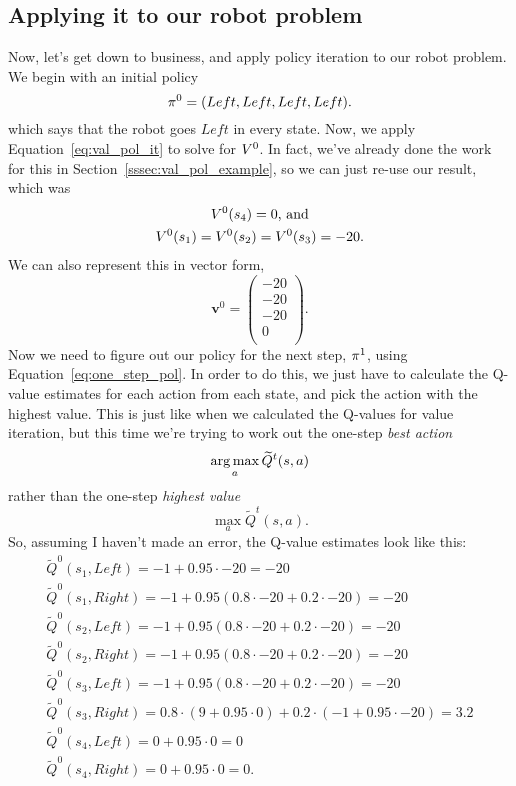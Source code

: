 \documentclass[a4paper]{article}
\begin{document}
\subsection{Applying it to our robot problem}
Now, let's get down to business, and apply policy iteration to our robot
problem.
We begin with an initial policy
\begin{equation*}
  \pi^0 = (Left, Left, Left, Left) .
\end{equation*}
which says that the robot goes $Left$ in every state.
Now, we apply Equation~\ref{eq:val_pol_it} to solve for $V^0$.
In fact, we've already done the work for this in
Section~\ref{sssec:val_pol_example}, so we can just re-use our result,
which was
\begin{gather*}
  V^0(s_4) = 0 \text{, and} \\
  V^0(s_1) = V^0(s_2) = V^0(s_3) = -20 .
\end{gather*}
We can also represent this in vector form,
\begin{equation*}
  \mathbf{v}^0 = \begin{pmatrix}
    -20 \\ -20 \\ -20 \\ 0 \\
  \end{pmatrix} .
\end{equation*}
Now we need to figure out our policy for the next step, $\pi^1$,
using Equation~\ref{eq:one_step_pol}.
In order to do this, we just have to calculate the Q-value estimates
for each action from each state, and pick the action with the highest value.
This is just like when we calculated the Q-values for value iteration,
but this time we're trying to work out the one-step \emph{best action}
$$\operatorname*{arg\,max}_a \widetilde{Q}^t(s, a) $$
rather than the one-step \emph{highest value}
$$\max_a \widetilde{Q}^t(s, a). $$
So, assuming I haven't made an error, the Q-value estimates look like this:
\begin{gather*}
  \widetilde{Q}^0(s_1, Left)  = -1 + 0.95 \cdot -20 = -20 \\
  \widetilde{Q}^0(s_1, Right) = -1 + 0.95 (0.8 \cdot -20 + 0.2 \cdot -20) = -20 \\
  \widetilde{Q}^0(s_2, Left)  = -1 + 0.95 (0.8 \cdot -20 + 0.2 \cdot -20) = -20 \\
  \widetilde{Q}^0(s_2, Right) = -1 + 0.95 (0.8 \cdot -20 + 0.2 \cdot -20) = -20 \\
  \widetilde{Q}^0(s_3, Left)  = -1 + 0.95 (0.8 \cdot -20 + 0.2 \cdot -20) = -20 \\
  \widetilde{Q}^0(s_3, Right) = 0.8 \cdot (9 + 0.95 \cdot 0) + 0.2 \cdot (-1 + 0.95 \cdot -20) = 3.2 \\
  \widetilde{Q}^0(s_4, Left)  = 0 + 0.95 \cdot 0 = 0 \\
  \widetilde{Q}^0(s_4, Right) = 0 + 0.95 \cdot 0 = 0 .
\end{gather*}
\end{document}
